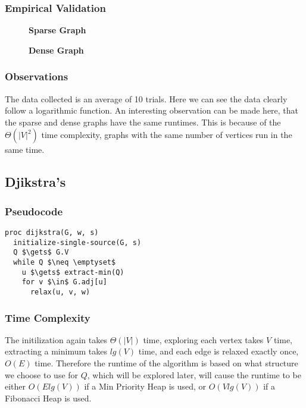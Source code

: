 \documentclass[a4paper,12pt]{article}
\begin{document}
\subsubsection{Empirical Validation}
\begin{figure}[H]
  \centering
  \textbf{Sparse Graph}\par\medskip
\end{figure}
\begin{figure}[H]
  \centering
  \textbf{Dense Graph}\par\medskip
\end{figure}
\subsubsection{Observations}
The data collected is an average of 10 trials. Here we can see the data clearly follow a logarithmic function. An interesting observation can be made here, that the sparse and dense graphs have the same runtimes. This is because of the $\Theta(|V|^2)$ time complexity, graphs with the same number of vertices run in the same time.
\subsection{Djikstra's}
\subsubsection{Pseudocode}
\begin{lstlisting}[mathescape=true]
proc dijkstra(G, w, s)
  initialize-single-source(G, s)
  Q $\gets$ G.V
  while Q $\neq \emptyset$
    u $\gets$ extract-min(Q)
    for v $\in$ G.adj[u]
      relax(u, v, w)
\end{lstlisting}
\subsubsection{Time Complexity}
The initilization again takes $\Theta(|V|)$ time, exploring each vertex takes $V$ time, extracting a minimum takes $lg(V)$ time, and each edge is relaxed exactly once, $O(E)$ time. Therefore the runtime of the algorithm is based on what structure we choose to use for $Q$, which will be explored later, will cause the runtime to be either $O(Elg(V))$ if a Min Priority Heap is used, or $O(Vlg(V))$ if a Fibonacci Heap is used.
\end{document}
